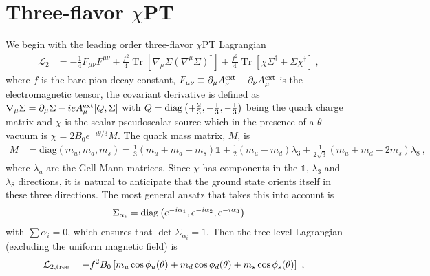 \documentclass[12pt]{elsarticle}
\DeclareMathOperator{\Tr}{Tr}
\begin{document}
\section{Three-flavor $\chi$PT}
\label{sec:3f}
\noindent
We begin with the leading order three-flavor $\chi$PT  Lagrangian~\cite{Gasser:1984gg,scherer2011primer}
\begin{equation}
\begin{split}
\mathcal{L}_{2}&=-\frac{1}{4}F_{\mu\nu}F^{\mu\nu}+\frac{f^{2}}{4}\Tr\left [\nabla_{\mu}\Sigma(\nabla^{\mu}\Sigma)^{\dagger} \right ]+\frac{f^{2}}{4}\Tr\left[\chi\Sigma^{\dagger}+\Sigma\chi^{\dagger} \right ]\ ,
\end{split}
\end{equation}
where $f$ is the bare pion decay constant, $F_{\mu\nu}\equiv\partial_{\mu}A^{\rm ext}_{\nu}-\partial_{\nu}A^{\rm ext}_{\mu}$ is the electromagnetic tensor, the covariant derivative is defined as $\nabla_{\mu}\Sigma=\partial_{\mu}\Sigma-ieA^{\rm ext}_{\mu}[Q,\Sigma]$ with $Q={\rm diag}\left(+\tfrac{2}{3},-\tfrac{1}{3},-\tfrac{1}{3}\right)$ being the quark charge matrix and $\chi$ is the scalar-pseudoscalar source which in the presence of a $\theta$-vacuum is $\chi=2B_{0}e^{-i\theta/3}M$. The quark mass matrix, $M$, is
\begin{equation}
\begin{split}
M&=\textrm{diag}{(m_{u},m_{d},m_{s})}=\tfrac{1}{3}(m_{u}+m_{d}+m_{s})\mathbb{1}+\tfrac{1}{2}(m_{u}-m_{d})\lambda_{3}+\tfrac{1}{2\sqrt{3}}(m_{u}+m_{d}-2m_{s})\lambda_{8}\ ,
\end{split}
\end{equation}
where $\lambda_{a}$ are the Gell-Mann matrices. Since $\chi$ has components in the $\mathbb{1}$, $\lambda_{3}$ and $\lambda_{8}$ directions, it is natural to anticipate that the ground state orients itself in these three directions. The most general ansatz that takes this into account is
\begin{equation}
\begin{split}
\Sigma_{\alpha_{i}}={\rm diag}\left (e^{-i\alpha_{1}},e^{-i\alpha_{2}},e^{-i\alpha_{3}} \right)
\end{split}
\end{equation}
with $\sum\alpha_{i}=0$, which ensures that $\det\Sigma_{\alpha_{i}}=1$. Then the tree-level Lagrangian (excluding the uniform magnetic field) is
\begin{equation}
\begin{split}
\label{eq:Ftree}
\mathcal{L}_{2,\rm tree}&=-f^{2}B_{0}\left[m_{u}\cos\phi_{u}(\theta)+m_{d}\cos\phi_{d}(\theta)+m_{s}\cos\phi_{s}(\theta)\right]\ ,
\end{split}
\end{equation}
\end{document}
